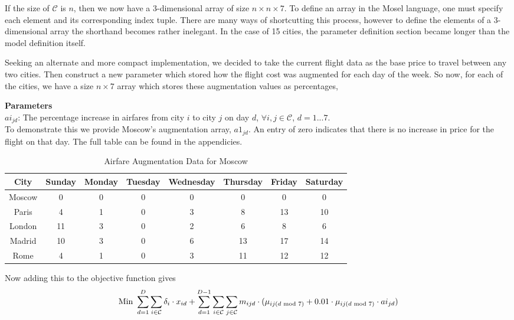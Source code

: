 \documentclass[12pt]{article}
\begin{document}
If the size of $\mathcal{C}$ is $n$, then we now have a 3-dimensional array of size $n\times n\times 7$. To define an array in the Mosel language, one must specify each element and its corresponding index tuple. There are many ways of shortcutting this process, however to define the elements of a 3-dimensional array the shorthand becomes rather inelegant. In the case of 15 cities, the parameter definition section became longer than the model definition itself.

Seeking an alternate and more compact implementation, we decided to take the current flight data as the base price to travel between any two cities. Then construct a new parameter which stored how the flight cost was augmented for each day of the week. So now, for each of the cities, we have a size $n \times 7$ array which stores these augmentation values as percentages,

\textbf{Parameters} \\
$ai_{jd}$: The percentage increase in airfares from city $i$ to city $j$ on day $d$, $\forall i,j \in \mathcal{C}$, $d=1...7$.\\

To demonstrate this we provide Moscow's augmentation array, $a1_{jd}$. An entry of zero indicates that there is no increase in price for the flight on that day. The full table can be found in the appendicies.\\
\begin{table}[h]
	\caption{Airfare Augmentation Data for Moscow}
	\centering
	\vspace{1mm}
	\begin{tabular}{c|c|c|c|c|c|c|c}
		\hline
		\rule{0pt}{2ex} City & Sunday & Monday & Tuesday & Wednesday & Thursday & Friday & Saturday \\
		\hline
		\rule{0pt}{2ex}Moscow & 0 & 0 & 0 & 0 & 0 & 0 & 0 \\
		Paris & 4 & 1 & 0 & 3 & 8 & 13 & 10 \\
		London & 11 & 3 & 0 & 2 & 6 & 8 & 6 \\
		Madrid & 10 & 3 & 0 & 6 & 13 & 17 & 14 \\
		Rome & 4 & 1 & 0 & 3 & 11 & 12 & 12 \\
	\end{tabular}
\end{table}

Now adding this to the objective function gives
\begin{equation*}
\text{Min } \sum_{d=1}^{D} \sum_{i \in \mathcal{C}} \delta_{i} \cdot x_{id} + \sum_{d=1}^{D-1} \sum_{i \in \mathcal{C}} \sum_{j \in \mathcal{C}} m_{ijd} \cdot (\mu_{ij(d \text{ mod }7)} + 0.01 \cdot \mu_{ij(d \text{ mod }7)} \cdot ai_{jd}) \\
\end{equation*}
\end{document}
